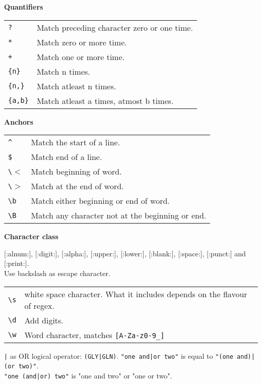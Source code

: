 \textbf{Quantifiers}
\begin{tabularx}{\linewidth}{lX}
\texttt{?} & Match preceding character zero or one time. \\
\texttt{*} & Match zero or more time.\\
\texttt{+} & Match one or more time.\\
\texttt{\{n\}} & Match n times.\\
\texttt{\{n,\}} & Match atleast n times.\\
\texttt{\{a,b\}} & Match atleast a times, atmost b times.\\

\hline

\end{tabularx}

\textbf{Anchors}

\begin{tabularx}{\linewidth}{lX}

\texttt{\^{}} & Match the start of a line.\\
\texttt{\$} & Match end of a line.\\
\texttt{\textbackslash $<$} & Match beginning of word.\\
\texttt{\textbackslash $>$} & Match at the end of word.\\
\texttt{\textbackslash b} & Match either beginning or end of word.\\
\texttt{\textbackslash B} & Match any character not at the beginning or end. \\

\hline

\end{tabularx}

\textbf{Character class}

[:alnum:], [:digit:], [:alpha:], [:upper:], [:lower:], [:blank:], [:space:], [:punct:] and [:print:].\\

Use backslash as escape character. \\
\begin{tabularx}{\linewidth}{lX}
\texttt{\textbackslash s} & white space character. What it includes depends on the flavour of regex.\\
\texttt{\textbackslash d} & Add digits.\\
\texttt{\textbackslash w} & Word character, matches \texttt{[A-Za-z0-9\_]}\\
\end{tabularx}
\texttt{|} as OR logical operator: \texttt{(GLY|GLN)}.
\texttt{"one and|or two"} is equal to \texttt{"(one and)|(or two)"}.\\
\texttt{"one (and|or) two"} is "one and two" or "one or two".\\

